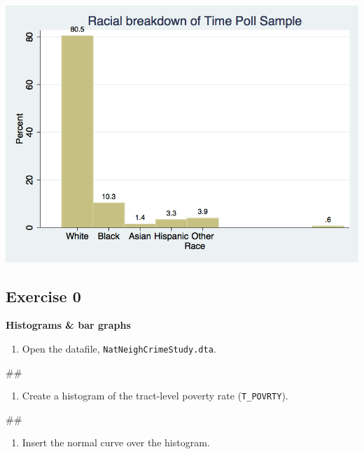 \documentclass[
]{book}
\newenvironment{Shaded}{\begin{snugshade}}{\end{snugshade}}
\newcommand{\NormalTok}[1]{#1}
\providecommand{\tightlist}{%
  \setlength{\itemsep}{0pt}\setlength{\parskip}{0pt}}
\begin{document}
\includegraphics{Stata/StataGraphics/images/bargraph.png}

\hypertarget{exercise-0-8}{%
\subsection{Exercise 0}\label{exercise-0-8}}

\textbf{Histograms \& bar graphs}

\begin{enumerate}
\def\labelenumi{\arabic{enumi}.}
\tightlist
\item
  Open the datafile, \texttt{NatNeighCrimeStudy.dta}.
\end{enumerate}

\begin{Shaded}
\begin{Highlighting}[]
\NormalTok{\#\#}
\end{Highlighting}
\end{Shaded}

\begin{enumerate}
\def\labelenumi{\arabic{enumi}.}
\setcounter{enumi}{1}
\tightlist
\item
  Create a histogram of the tract-level poverty rate (\texttt{T\_POVRTY}).
\end{enumerate}

\begin{Shaded}
\begin{Highlighting}[]
\NormalTok{\#\#}
\end{Highlighting}
\end{Shaded}

\begin{enumerate}
\def\labelenumi{\arabic{enumi}.}
\setcounter{enumi}{2}
\tightlist
\item
  Insert the normal curve over the histogram.
\end{enumerate}
\end{document}
